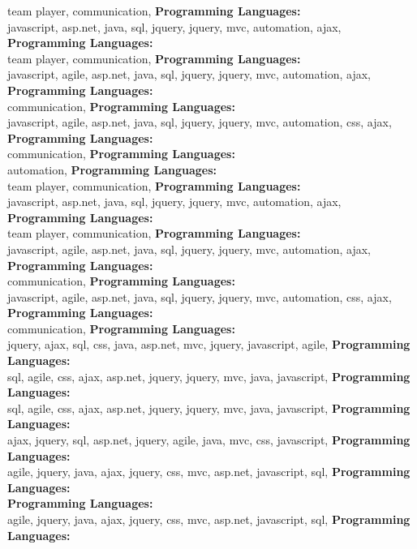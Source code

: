 team player,  communication, \textbf{Programming Languages:} \\
javascript, asp.net, java, sql,  jquery, jquery, mvc, automation, ajax, \textbf{Programming Languages:} \\
team player,  communication, \textbf{Programming Languages:} \\
javascript, agile, asp.net, java, sql,  jquery, jquery, mvc, automation, ajax, \textbf{Programming Languages:} \\
 communication, \textbf{Programming Languages:} \\
javascript, agile, asp.net, java, sql,  jquery, jquery, mvc, automation, css, ajax, \textbf{Programming Languages:} \\
 communication, \textbf{Programming Languages:} \\
automation, \textbf{Programming Languages:} \\
team player,  communication, \textbf{Programming Languages:} \\
javascript, asp.net, java, sql,  jquery, jquery, mvc, automation, ajax, \textbf{Programming Languages:} \\
team player,  communication, \textbf{Programming Languages:} \\
javascript, agile, asp.net, java, sql,  jquery, jquery, mvc, automation, ajax, \textbf{Programming Languages:} \\
 communication, \textbf{Programming Languages:} \\
javascript, agile, asp.net, java, sql,  jquery, jquery, mvc, automation, css, ajax, \textbf{Programming Languages:} \\
 communication, \textbf{Programming Languages:} \\
 jquery, ajax, sql, css, java, asp.net, mvc, jquery, javascript, agile, \textbf{Programming Languages:} \\
sql, agile, css, ajax, asp.net,  jquery, jquery, mvc, java, javascript, \textbf{Programming Languages:} \\
sql, agile, css, ajax, asp.net,  jquery, jquery, mvc, java, javascript, \textbf{Programming Languages:} \\
ajax,  jquery, sql, asp.net, jquery, agile, java, mvc, css, javascript, \textbf{Programming Languages:} \\
agile,  jquery, java, ajax, jquery, css, mvc, asp.net, javascript, sql, \textbf{Programming Languages:} \\
\textbf{Programming Languages:} \\
agile,  jquery, java, ajax, jquery, css, mvc, asp.net, javascript, sql, \textbf{Programming Languages:} \\
